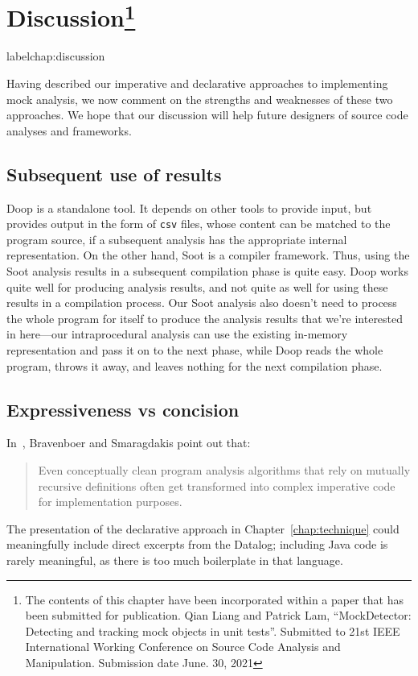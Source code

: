 \chapter[Discussion]{Discussion\footnote{The contents of this 
		chapter have been incorporated within a paper that has been submitted for publication. Qian Liang and Patrick Lam, “MockDetector: Detecting and tracking mock objects in unit tests”.
		Submitted to 21st IEEE International Working Conference on 
		Source Code Analysis and Manipulation. Submission date June. 30, 2021}}
label{chap:discussion}

Having described our imperative and declarative approaches to implementing mock analysis, we now comment on the strengths and weaknesses of these two approaches. We hope that our discussion will help future designers of source code analyses and frameworks.

\section{Subsequent use of results} 

Doop is a standalone tool. It depends on other tools to provide input, but provides output in the form of \texttt{csv} files, whose content can be matched to the program source, if a subsequent analysis has the appropriate internal representation. On the other hand, Soot is a compiler framework. Thus, using the Soot analysis results in a subsequent compilation phase is quite easy. Doop works quite well for producing analysis results, and not quite as well for using these results in a compilation process. Our Soot analysis also doesn't need to process the whole program for itself to produce the analysis results that we're interested in here---our intraprocedural analysis can use the existing in-memory representation and pass it on to the next phase, while Doop reads the whole program, throws it away, and leaves nothing for the next compilation phase. 

\section{Expressiveness vs concision}

In~\cite{bravenboer09:_stric_declar_specif_sophis_point_analy}, Bravenboer and Smaragdakis point out that:
\begin{quote}
	Even conceptually clean program analysis algorithms that
	rely on mutually recursive definitions often get transformed
	into complex imperative code for implementation purposes.
\end{quote}
The presentation of the declarative approach in Chapter~\ref{chap:technique} could meaningfully include direct excerpts from the Datalog; including Java code is rarely meaningful, as there is too much boilerplate in that language.

